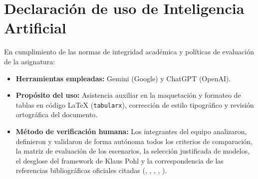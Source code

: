 \documentclass[conference]{IEEEtran}
\begin{document}
	\section*{Declaración de uso de Inteligencia Artificial}
	En cumplimiento de las normas de integridad académica y políticas de evaluación de la asignatura:
	\begin{itemize}[leftmargin=*,itemsep=2pt,topsep=2pt]
		\item \textbf{Herramientas empleadas:} Gemini (Google) y ChatGPT (OpenAI).
		\item \textbf{Propósito del uso:} Asistencia auxiliar en la maquetación y formateo de tablas en código \LaTeX{} (\texttt{tabularx}), corrección de estilo tipográfico y revisión ortográfica del documento.
		\item \textbf{Método de verificación humana:} Los integrantes del equipo analizaron, definieron y validaron de forma autónoma todos los criterios de comparación, la matriz de evaluación de los escenarios, la selección justificada de modelos, el desglose del framework de Klaus Pohl y la correspondencia de las referencias bibliográficas oficiales citadas (\cite{pohl2025}, \cite{swebok2024}, \cite{ieee29148}, \cite{iso25010}, \cite{lopdp2021}).
	\end{itemize}
	
\end{document}
